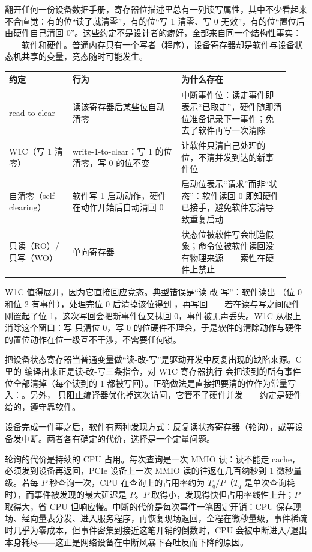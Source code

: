 翻开任何一份设备数据手册，寄存器位描述里总有一列读写属性，其中不少看起来不合直觉：有的位“读了就清零”，有的位“写 1 清零、写 0 无效”，有的位“置位后由硬件自己清回 0”。这些约定不是设计者的癖好，全部来自同一个结构性事实：——软件和硬件。普通内存只有一个写者（程序），设备寄存器却是软件与设备状态机共享的变量，竞态随时可能发生。

\begin{longtable}{L{0.21\linewidth}L{0.36\linewidth}L{0.36\linewidth}}
\toprule
约定 & 行为 & 为什么存在 \\
\midrule
read-to-clear & 读该寄存器后某些位自动清零 & 中断事件位：读走事件即表示“已取走”，硬件随即清位准备记录下一事件；免去了软件再写一次清除 \\\tablerowrule
W1C（写 1 清零） & write-1-to-clear：写 1 的位清零，写 0 的位不变 & 让软件只清自己处理的位，不清并发到达的新事件位 \\\tablerowrule
自清零（self-clearing） & 软件写 1 启动动作，硬件在动作开始后自动清回 0 & 启动位表示“请求”而非“状态”：软件读回 0 即知硬件已接手，避免软件忘清导致重复启动 \\\tablerowrule
只读（RO）/ 只写（WO） & 单向寄存器 & 状态位被软件写会制造假象；命令位被软件读回没有物理来源——索性在硬件上禁止 \\
\bottomrule
\end{longtable}

W1C 值得展开，因为它直接回应竞态。典型错误是“读-改-写”：软件读出 （位 0 和位 2 有事件），处理完位 0 后清掉该位得到 ，再写回——若在读与写之间硬件刚置起了位 1，这次写回会把新事件位又抹回 0，事件被无声丢失。W1C 从根上消除这个窗口：写  只清位 0，写 0 的位硬件不理会，于是软件的清除动作与硬件的置位动作在位一级互不干涉，不需要任何锁。

\begin{warningbox}
把设备状态寄存器当普通变量做“读-改-写”是驱动开发中反复出现的缺陷来源。C 里的  编译出来正是读-改-写三条指令，对 W1C 寄存器执行 \code{|=} 会把读到的所有事件位全部清掉（每个读到的 1 都被写回）。正确做法是直接把要清的位作为常量写入：。另外， 只阻止编译器优化掉这次访问，它管不了硬件并发——约定是硬件给的，遵守靠软件。
\end{warningbox}


设备完成一件事之后，软件有两种发现方式：反复读状态寄存器（轮询），或等设备发中断。两者各有确定的代价，选择是一个定量问题。

轮询的代价是持续的 CPU 占用。每次查询是一次 MMIO 读：读不能走 cache，必须发到设备再返回，PCIe 设备上一次 MMIO 读的往返在几百纳秒到 1 微秒量级。若每 $P$ 秒查询一次，CPU 在查询上的占用率约为 $T_q/P$（$T_q$ 是单次查询耗时），而事件被发现的最大延迟是 $P$。$P$ 取得小，发现得快但占用率线性上升；$P$ 取得大，省 CPU 但响应慢。中断的代价是每次事件一笔固定开销：CPU 保存现场、经向量表分发、进入服务程序，再恢复现场返回，全程在微秒量级，事件稀疏时几乎为零成本，但事件密集到接近这笔开销的倒数时，CPU 会被中断进入/退出本身耗尽——这正是网络设备在中断风暴下吞吐反而下降的原因。


